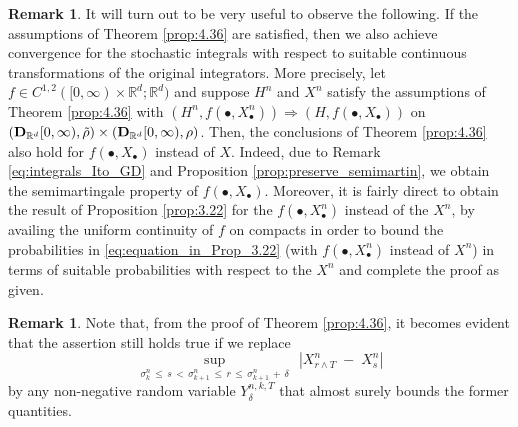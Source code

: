 \documentclass[11pt]{article}
\theoremstyle{definition}\newtheorem{example}[theorem]{Example}
\theoremstyle{definition}\newtheorem{counterexample}[theorem]{Counterexample}
\theoremstyle{definition}\newtheorem{remark}[theorem]{Remark}
\theoremstyle{definition}\newtheorem{defi}[theorem]{Definition}
\numberwithin{equation}{section}
\newcommand{\R}{\mathbb{R}}
\newcommand{\D}{{\bf D}}											%
\renewcommand{\sup}[1]{\underset{#1}{\operatorname{sup}}\;}					%
\renewcommand{\|}{\; : \, \;}											%
\begin{document}
\begin{remark} \label{rem:alternative_AVCI_cont_ext} 
	It will turn out to be very useful to observe the following. If the assumptions of Theorem \ref{prop:4.36} are satisfied, then we also achieve convergence for the stochastic integrals with respect to suitable continuous transformations of the original integrators. More precisely, let $f \in C^{1,2}([0,\infty) \times \R^d ; \R^d)$ and  suppose $H^n$ and $X^n$ satisfy the assumptions of Theorem \ref{prop:4.36} with $(H^n,f(\bullet,X^n_\bullet)) \Rightarrow (H,f(\bullet, X_\bullet))$ on $(\D_{\R^{d}}[0,\infty),\tilde{\rho}) \times (\D_{\R^{d}}[0,\infty),\rho)$. Then, the conclusions of Theorem \ref{prop:4.36} also hold for $f(\bullet, X_\bullet)$ instead of $X$. Indeed, due to Remark \ref{eq:integrals_Ito_GD} and Proposition \ref{prop:preserve_semimartin}, we obtain the semimartingale property of $f(\bullet, X_\bullet)$. Moreover, it is fairly direct to obtain the result of Proposition \ref{prop:3.22} for the $f(\bullet, X^n_\bullet)$ instead of the $X^n$, by availing the uniform continuity of $f$ on compacts in order to bound the probabilities in \eqref{eq:equation_in_Prop_3.22} (with $f(\bullet, X^n_\bullet)$ instead of $X^n$) in terms of suitable probabilities with respect to the $X^n$ and complete the proof as given.
\end{remark}

\begin{remark}
	Note that, from the proof of Theorem \ref{prop:4.36}, it becomes evident that the assertion still holds true if we replace
	$$\sup{\sigma^{n}_{k}\, \le \, s \, < \, \sigma^{n}_{k+1} \, \le \, r \, \le \, \sigma^{n}_{k+1} \,  + \, \delta } \, |X^n_{r\wedge T} \; - \; X^n_{s}|$$ by any non-negative random variable $Y^{n,k,T}_\delta$ that almost surely bounds the former quantities.
\end{remark}
\end{document}
